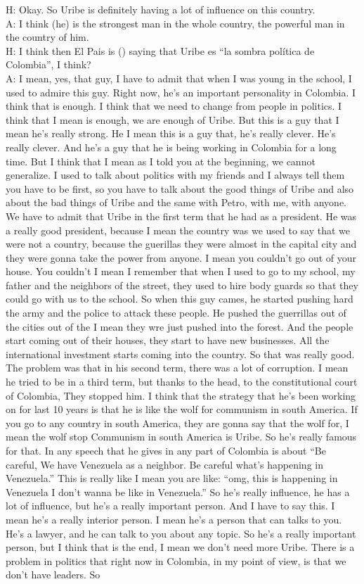 \documentclass{phyasgn}\usepackage{nag}
\begin{document}
H: Okay. So Uribe is definitely having a lot of influence on this country.\\
A: I think (he) is the strongest man in the whole country, the powerful man in the country of him.\\
H: I think then El Pais is () saying that Uribe es “la sombra política de Colombia”, I think?\\
A: I mean, yes, that guy, I have to admit that when I was young in the school, I used to admire this guy. Right now, he's an important personality in Colombia. I think that is enough. I think that we need to change from people in politics. I think that I mean is enough, we are enough of Uribe. But this is a guy that I mean he's really strong. He I mean this is a guy that, he's really clever. He’s really clever. And he's a guy that he is being working in Colombia for a long time. But I think that I mean as I told you at the beginning, we cannot generalize. I used to talk about politics with my friends and I always tell them you have to be first, so you have to talk about the good things of Uribe and also about the bad things of Uribe and the same with Petro, with me, with anyone. We have to admit that Uribe in the first term that he had as a president. He was a really good president, because I mean the country was we used to say that we were not a country, because the guerillas they were almost in the capital city and they were gonna take the power from anyone. I mean you couldn't go out of your house. You couldn't I mean I remember that when I used to go to my school, my father and the neighbors of the street, they used to hire body guards so that they could go with us to the school. So when this guy cames, he started pushing hard the army and the police to attack these people. He pushed the guerrillas out of the cities out of the I mean they wre just pushed into the forest. And the people start coming out of their houses, they start to have new businesses. All the international investment starts coming into the country. So that was really good. The problem was that in his second term, there was a lot of corruption. I mean he tried to be in a third term, but thanks to the head, to the constitutional court of Colombia, They stopped him. I think that the strategy that he's been working on for last 10 years is that he is like the wolf for communism in south America. If you go to any country in south America, they are gonna say that the wolf for, I mean the wolf stop Communism in south America is Uribe. So he's really famous for that. In any speech that he gives in any part of Colombia is about “Be careful, We have Venezuela as a neighbor. Be careful what's happening in Venezuela.” This is really like I mean you are like: “omg, this is happening in Venezuela I don’t wanna be like in Venezuela.” So he's really influence, he has a lot of influence, but he's a really important person. And I have to say this. I mean he's a really interior person. I mean he's a person that can talks to you. He's a lawyer, and he can talk to you about any topic. So he's a really important person, but I think that is the end, I mean we don't need more Uribe. There is a problem in politics that right now in Colombia, in my point of view, is that we don't have leaders. So 
\end{document}
